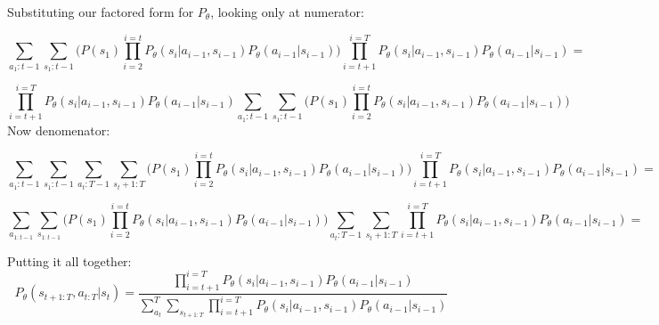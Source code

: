 \documentclass[a4paper]{article}
\begin{document}
 
 Substituting our factored form for $P_\theta$, looking  only at numerator:
 
  $$\sum_{a_1:t-1}\sum_{s_1:t-1} \Bigg( P(s_1)\prod_{i = 2}^{i = t}P_\theta(s_i|a_{i-1}, s_{i-1})P_\theta(a_{i-1}|s_{i-1}) \Bigg) \prod_{i = t+1}^{i = T}P_\theta(s_i|a_{i-1}, s_{i-1})P_\theta(a_{i-1}|s_{i-1}) = $$
  
  $$\prod_{i = t+1}^{i = T}P_\theta(s_i|a_{i-1}, s_{i-1})P_\theta(a_{i-1}|s_{i-1}) \sum_{a_1:t-1}\sum_{s_1:t-1} \Bigg( P(s_1)\prod_{i = 2}^{i = t}P_\theta(s_i|a_{i-1}, s_{i-1})P_\theta(a_{i-1}|s_{i-1}) \Bigg)$$
 Now denomenator: 
 
 $$\sum_{a_1:t-1}\sum_{s_1:t-1} \sum_{a_t:T-1}\sum_{s_t+1:T} \Bigg( P(s_1)\prod_{i = 2}^{i = t}P_\theta(s_i|a_{i-1}, s_{i-1})P_\theta(a_{i-1}|s_{i-1}) \Bigg) \prod_{i = t+1}^{i = T}P_\theta(s_i|a_{i-1}, s_{i-1})P_\theta(a_{i-1}|s_{i-1}) = $$
 
  $$\sum_{a_{1:t-1}}\sum_{s_{1:t-1}} \Bigg( P(s_1)\prod_{i = 2}^{i = t}P_\theta(s_i|a_{i-1}, s_{i-1})P_\theta(a_{i-1}|s_{i-1}) \Bigg) \sum_{a_t:T-1}\sum_{s_t+1:T}  \prod_{i = t+1}^{i = T}P_\theta(s_i|a_{i-1}, s_{i-1})P_\theta(a_{i-1}|s_{i-1}) = $$
  
  Putting it all together:
  $$P_\theta(s_{t+1:T}, a_{t:T} | s_t) = \frac{ \prod_{i = t+1}^{i = T}P_\theta(s_i|a_{i-1}, s_{i-1})P_\theta(a_{i-1}|s_{i-1})}{ \sum_{a_t}^T\sum_{s_{t+1:T}} \prod_{i = t+1}^{i = T}P_\theta(s_i|a_{i-1}, s_{i-1})P_\theta(a_{i-1}|s_{i-1})}$$
  
\end{document}

